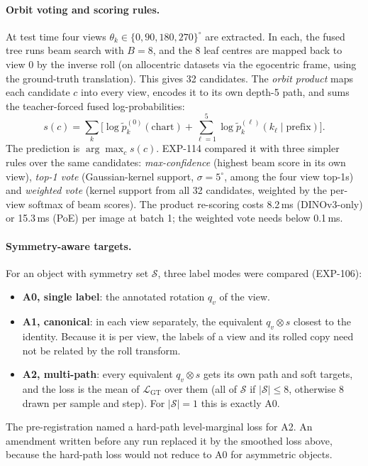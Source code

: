 \paragraph{Orbit voting and scoring rules.}
At test time four views $\theta_k\in\{0,90,180,270\}^\circ$ are extracted. In each, the fused tree runs beam search with $B=8$, and the 8 leaf centres are mapped back to view 0 by the inverse roll (on allocentric datasets via the egocentric frame, using the ground-truth translation). This gives 32 candidates. The \emph{orbit product} maps each candidate $c$ into every view, encodes it to its own depth-5 path, and sums the teacher-forced fused log-probabilities:
\begin{equation}
  s(c)=\textstyle\sum_{k}\big[\log\tilde p_k^{(0)}(\text{chart})+\sum_{\ell=1}^{5}\log\tilde p_k^{(\ell)}(k_\ell\mid\text{prefix})\big].
\end{equation}
The prediction is $\arg\max_c s(c)$. EXP-114 compared it with three simpler rules over the same candidates: \emph{max-confidence} (highest beam score in its own view), \emph{top-1 vote} (Gaussian-kernel support, $\sigma=5^\circ$, among the four view top-1s) and \emph{weighted vote} (kernel support from all 32 candidates, weighted by the per-view softmax of beam scores). The product re-scoring costs 8.2\,ms (DINOv3-only) or 15.3\,ms (PoE) per image at batch 1; the weighted vote needs below 0.1\,ms.

\paragraph{Symmetry-aware targets.}
For an object with symmetry set $\mathcal{S}$, three label modes were compared (EXP-106):
\begin{itemize}
  \item \textbf{A0, single label}: the annotated rotation $q_v$ of the view.
  \item \textbf{A1, canonical}: in each view separately, the equivalent $q_v\otimes s$ closest to the identity. Because it is per view, the labels of a view and its rolled copy need not be related by the roll transform.
  \item \textbf{A2, multi-path}: every equivalent $q_v\otimes s$ gets its own path and soft targets, and the loss is the mean of $\mathcal{L}_{\text{GT}}$ over them (all of $\mathcal{S}$ if $|\mathcal{S}|\le8$, otherwise 8 drawn per sample and step). For $|\mathcal{S}|=1$ this is exactly A0.
\end{itemize}
The pre-registration named a hard-path level-marginal loss for A2. An amendment written before any run replaced it by the smoothed loss above, because the hard-path loss would not reduce to A0 for asymmetric objects.

